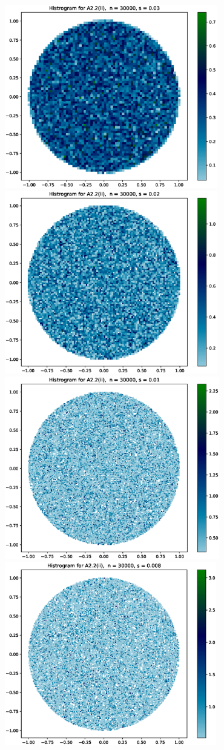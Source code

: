 \documentclass{article}
\begin{document}
\hspace*{-1.5cm}\includegraphics[height=8cm]{Figures_for_A2.2_ii//7.eps} \hspace*{-1.5cm}
\includegraphics[height=8cm]{Figures_for_A2.2_ii//8.eps}\\
\hspace*{-1.5cm}\includegraphics[height=8cm]{Figures_for_A2.2_ii//9.eps} \hspace*{-1.5cm}
\includegraphics[height=8cm]{Figures_for_A2.2_ii//10.eps}\\
\end{document}
